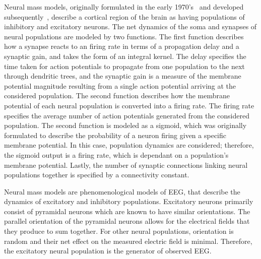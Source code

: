 Neural mass models, originally formulated in the early 1970's~\citep{wilson1973mathematical,lopes1974model,freeman1963electrical} and developed subsequently~\citep{jansen1995electroencephalogram}, describe a cortical region of the brain as having populations of inhibitory and excitatory neurons. The net dynamics of the soma and synapses of neural populations are modeled by two functions. The first function describes how a synapse reacts to an firing rate in terms of a propagation delay and a synaptic gain, and takes the form of an integral kernel. The delay specifies the time taken for action potentials to propagate from one population to the next through dendritic trees, and the synaptic gain is a measure of the membrane potential magnitude resulting from a single action potential arriving at the considered population. The second function describes how the membrane potential of each neural population is converted into a firing rate. The firing rate specifies the average number of action potentials generated from the considered population. The second function is modeled as a sigmoid, which was originally formulated to describe the probability of a neuron firing given a specific membrane potential. In this case, population dynamics are considered; therefore, the sigmoid output is a firing rate, which is dependant on a population's membrane potential. Lastly, the number of synaptic connections linking neural populations together is specified by a connectivity constant. 

Neural mass models are phenomenological models of EEG, that describe the dynamics of excitatory and inhibitory populations. Excitatory neurons primarily consist of pyramidal neurons \iref which are known to have similar orientations. The parallel orientation of the pyramidal neurons allows for the electrical fields that they produce to sum together. For other neural populations, orientation is random and their net effect on the measured electric field is minimal. Therefore, the excitatory neural population is the generator of observed EEG. 

